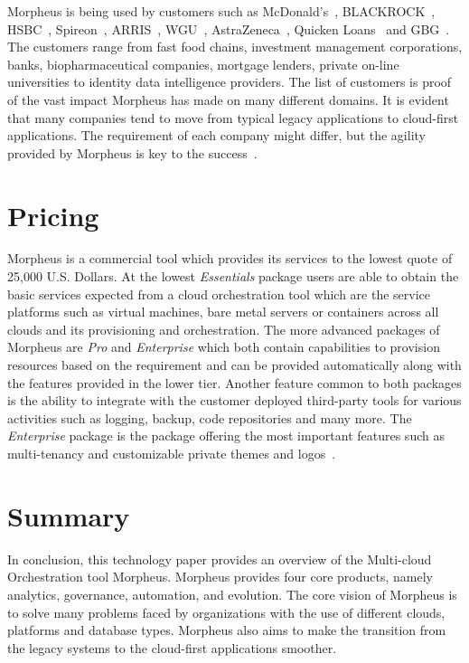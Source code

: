 Morpheus is being used by customers such as 
McDonald's~\cite{hid-sp18-416-www-mcdonalds}, 
BLACKROCK~\cite{hid-sp18-416-www-blackrock}, HSBC~\cite{hid-sp18-416-www-hsbc}, 
Spireon~\cite{hid-sp18-416-www-spireon}, ARRIS~\cite{hid-sp18-416-www-arris}, 
WGU~\cite{hid-sp18-416-www-wgu}, 
AstraZeneca~\cite{hid-sp18-416-www-astrazeneca}, 
Quicken Loans~\cite{hid-sp18-416-www-quickenloans} and 
GBG~\cite{hid-sp18-416-www-gbg}. The customers range from fast food chains, 
investment management corporations, banks, biopharmaceutical companies, 
mortgage lenders, private on-line universities to identity data intelligence 
providers. The list of customers is proof of the vast impact Morpheus has made 
on many different domains. It is evident that many companies tend to move from 
typical legacy applications to cloud-first applications. The requirement of 
each company might differ, but the agility provided by Morpheus is key to the 
success~\cite{hid-sp18-416-www-morpheus-customers}. 

\section{Pricing}
\label{sec:pricing}

Morpheus is a commercial tool which provides its services to the lowest quote 
of 25,000 U.S. Dollars. At the lowest \textit{Essentials} package users are 
able to obtain the basic services expected from a cloud orchestration tool 
which are the service platforms such as virtual machines, bare metal servers or 
containers across all clouds and its provisioning and orchestration. The more 
advanced packages of Morpheus are \textit{Pro} and \textit{Enterprise} which 
both contain capabilities to provision resources based on the requirement and 
can be provided automatically along with the features provided in the lower 
tier. Another feature common to both packages is the ability to integrate with 
the customer deployed third-party tools for various activities such as logging, 
backup, code repositories and many more. The \textit{Enterprise} package is the 
package offering the most important features such as multi-tenancy and 
customizable private themes and logos~\cite{hid-sp18-416-www-morpheus-pricing}. 

\section{Summary}
\label{sec:summary}

In conclusion, this technology paper provides an overview of the Multi-cloud 
Orchestration tool Morpheus. Morpheus provides four core products, namely 
analytics, governance, automation, and evolution. The core vision of Morpheus 
is to solve many problems faced by organizations with the use of different 
clouds, platforms and database types. Morpheus also aims to make the transition 
from the legacy systems to the cloud-first applications smoother.  
 

